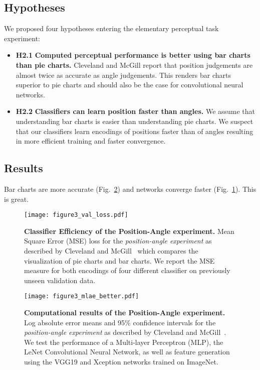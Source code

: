 \subsection{Hypotheses}

We proposed four hypotheses entering the elementary perceptual task experiment:

\begin{itemize}
	\item \textbf{H2.1} \textbf{Computed perceptual performance is better using bar charts than pie charts.} Cleveland and McGill report that position judgements are almost twice as accurate as angle judgements. This renders bar charts superior to pie charts and should also be the case for convolutional neural networks.
	\item \textbf{H2.2} \textbf{Classifiers can learn position faster than angles.} We assume that understanding bar charts is easier than understanding pie charts. We suspect that our classifiers learn encodings of positions faster than of angles resulting in more efficient training and faster convergence.
\end{itemize}

\subsection{Results}


Bar charts are more accurate (Fig.~\ref{fig:figure3_mlae}) and networks converge faster (Fig.~\ref{fig:figure3_val_loss}). This is great.

\begin{figure}[t]
	  \texttt{[image: figure3\_val\_loss.pdf]}
  \caption{\textbf{Classifier Efficiency of the Position-Angle experiment.} Mean Square Error (MSE) loss for the \emph{position-angle experiment} as described by Cleveland and McGill~\cite{cleveland_mcgill} which compares the visualization of pie charts and bar charts. We report the MSE measure for both encodings of four different classifier on previously unseen validation data.}
	\label{fig:figure3_val_loss}
\end{figure}

\begin{figure}[t]
	  \texttt{[image: figure3\_mlae\_better.pdf]}
  \caption{\textbf{Computational results of the Position-Angle experiment.} Log absolute error means and 95\% confidence intervals for the \emph{position-angle experiment} as described by Cleveland and McGill~\cite{cleveland_mcgill}. We test the performance of a Multi-layer Perceptron (MLP), the LeNet Convolutional Neural Network, as well as feature generation using the VGG19 and Xception networks trained on ImageNet.}
	\label{fig:figure3_mlae}
\end{figure}
